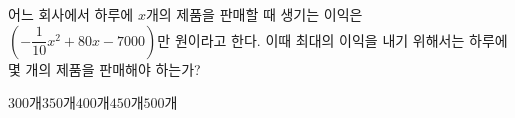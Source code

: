 \hspace*{2mm}\begin{minipage}[t]{\dimexpr\linewidth-2mm\relax}\vspace{0pt}
어느 회사에서 하루에 $x$개의 제품을 판매할 때 생기는 이익은 $\left(-\dfrac{1}{10}x^2+80x-7000\right)$만 원이라고 한다. 이때 최대의 이익을 내기 위해서는 하루에 몇 개의 제품을 판매해야 하는가?
\begin{choices32}{$300$개}{$350$개}{$400$개}{$450$개}{$500$개}\end{choices32}\end{minipage}
